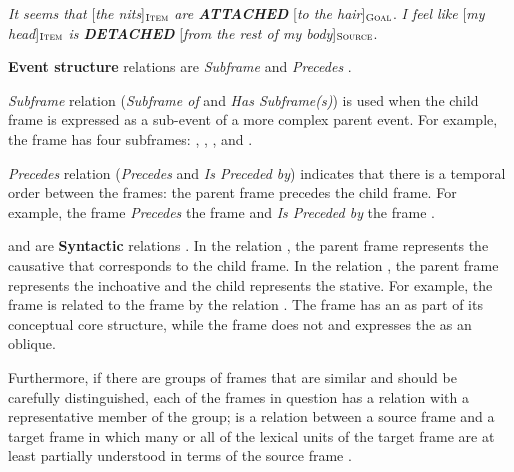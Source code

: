 \documentclass[output=paper,colorlinks,citecolor=brown]{langscibook}
\begin{document}
 \begin{exe}
 \ex  \label{ch01:ex:03}
  \textit{It seems that} [\textit{the nits}]$_{\text{\textsc{Item}}}$ \textit{are \textbf{ATTACHED}}  [\textit{to the hair}]$_{\text{\textsc{Goal}}}$.
 \ex  \label{ch01:ex:04}
  \textit{I feel like} [\textit{my head}]$_{\text{\textsc{Item}}}$  \textit{is \textbf{DETACHED} }  [\textit{from the rest of my body}]$_{\text{\textsc{Source}}}$.
\end{exe}


\textbf{Event structure} relations are \textit{Subframe} and \textit{Precedes}  \citep[867]{fillmore2010}. 

\textit{Subframe} relation (\textit{Subframe of} and \textit{Has Subframe(s)}) is used when the child frame is expressed as a sub-event of a more complex parent event. For example, the frame  has four subframes: , , , and .

\textit{Precedes} relation (\textit{Precedes} and \textit{Is Preceded by}) indicates that there is a temporal order between the frames: the parent frame precedes the child frame. For example, the frame  \textit{Precedes} the frame  and \textit{Is Preceded by} the frame .

 and  are  \textbf{Syntactic} relations \citep[331]{fillmore2010}. In the relation ,  the parent frame represents the causative  that corresponds to the child frame. In the relation ,  the parent frame  represents the inchoative and the child represents the stative. For example, the frame  is related to the frame  by the relation . The frame  has an  as part of its conceptual core structure, while the frame  does not and expresses the  as an oblique.

Furthermore, if there are groups of frames that are similar and should be carefully distinguished, each of the frames in question has a  relation with a representative member of the group;  is a relation between a source frame and a target frame in which many or all of the lexical units of the target frame are at least partially understood in terms of the source frame \citep[85]{Ruppenhofer2016}.
               
\end{document}
